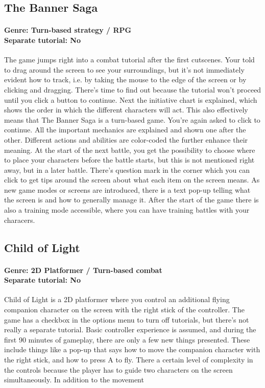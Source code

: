 \subsection{The Banner Saga}
\paragraph{Genre: Turn-based strategy / RPG \\ Separate tutorial: No \\}
The game jumps right into a combat tutorial after the first cutscenes. Your told to drag around the screen to see your surroundings, but it's not immediately evident how to track, i.e. by taking the mouse to the edge of the screen or by clicking and dragging. There's time to find out because the tutorial won't proceed until you click a button to continue. Next the initiative chart is explained, which shows the order in which the different characters will act. This also effectively means that The Banner Saga is a turn-based game. You're again asked to click to continue. All the important mechanics are explained and shown one after the other. Different actions and abilities are color-coded the further enhance their meaning. At the start of the next battle, you get the possibility to choose where to place your characters before the battle starts, but this is not mentioned right away, but in a later battle. There's question mark in the corner which you can click to get tips around the screen about what each item on the screen means. As new game modes or screens are introduced, there is a text pop-up telling what the screen is and how to generally manage it. After the start of the game there is also a training mode accessible, where you can have training battles with your characers.

\subsection{Child of Light}
\paragraph{Genre: 2D Platformer / Turn-based combat \\ Separate tutorial: No \\}
Child of Light is a 2D platformer where you control an additional flying companion character on the screen with the right stick of the controller. The game has a checkbox in the options menu to turn off tutorials, but there's not really a separate tutorial. Basic controller experience is assumed, and during the first 90 minutes of gameplay, there are only a few new things presented. These include things like a pop-up that says how to move the companion character with the right stick, and how to press A to fly. There a certain level of complexity in the controls because the player has to guide two characters on the screen simultaneously. In addition to the movement

